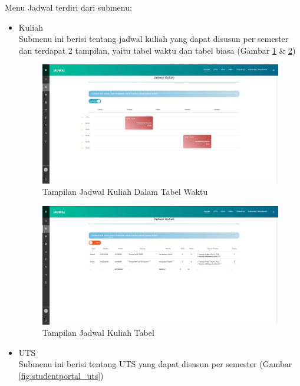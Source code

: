 \begin{enumerate}
\begin{itemize}
		Menu Jadwal terdiri dari submenu:
		\begin{itemize}
			\item Kuliah \\
			Submenu ini berisi tentang jadwal kuliah yang dapat disusun per semester dan terdapat 2 tampilan, yaitu tabel waktu dan tabel biasa (Gambar \ref{fig:studentportal_jadwal_kuliah_timetable} \& \ref{fig:studentportal_jadwal_kuliah_table})
			\begin{figure}[H]
			\centering
			\includegraphics[scale=0.3]{Gambar/studentportal_jadwal_kuliah}
			\caption{Tampilan Jadwal Kuliah Dalam Tabel Waktu}
			\label{fig:studentportal_jadwal_kuliah_timetable}
			\end{figure}
			\begin{figure}[H]
			\centering
			\includegraphics[scale=0.3]{Gambar/studentportal_jadwal_kuliah_table}
			\caption{Tampilan Jadwal Kuliah Tabel}
			\label{fig:studentportal_jadwal_kuliah_table}
			\end{figure}
			\item UTS \\
			Submenu ini berisi tentang UTS yang dapat disusun per semester (Gambar \ref{fig:studentportal_uts})
			\begin{figure}[H]
			\centering

\end{figure}
\end{itemize}
\end{itemize}
\end{enumerate}
